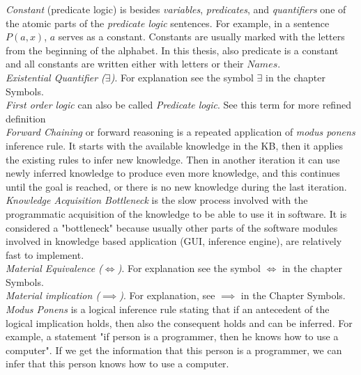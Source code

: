 \emph{Constant} (predicate logic) is besides \emph{variables}, 
\emph{predicates}, and \emph{quantifiers} one of the atomic parts of the 
\emph{predicate logic} sentences. For example, in a sentence $P(a,x)$, $a$ 
serves as a constant. Constants are usually marked with the letters from the
beginning of the alphabet. In this thesis, also predicate is a constant and
all constants are written either with letters or their $Names$.\\

\emph{Existential Quantifier ($\exists$)}. For explanation see the symbol
$\exists$ in the chapter Symbols.\\

\emph {First order logic} can also be called \emph{Predicate logic}. See this
term for more refined definition\\

\emph{Forward Chaining} or forward reasoning is a repeated application of
\emph{modus ponens} inference rule. It starts with the available knowledge in 
the KB, then it applies the existing rules to infer new knowledge. Then in
another iteration it can use newly inferred knowledge to produce even more 
knowledge, and this continues until the goal is reached, or there is no new
knowledge during the last iteration.\\

\emph{Knowledge Acquisition Bottleneck} is the slow process involved with
the programmatic acquisition of the knowledge to be able to use it in software.
It is considered a "bottleneck" because usually other parts of the software
modules involved in knowledge based application (GUI, inference engine), are
relatively fast to implement.\\

\emph{Material Equivalence ($\iff$)}. For explanation see the symbol $\iff$ in the
chapter Symbols.\\

\emph{Material implication ($\implies$)}. For explanation, see $\implies$ in the
Chapter Symbols.\\

\emph{Modus Ponens} is a logical inference rule stating that if an antecedent
of the logical implication holds, then also the consequent holds and can be
inferred. For example, a statement "if person is a 
programmer, then he knows how to use a computer". If we get the information
that this person is a programmer, we can infer that this person knows how to
use a computer. \\

